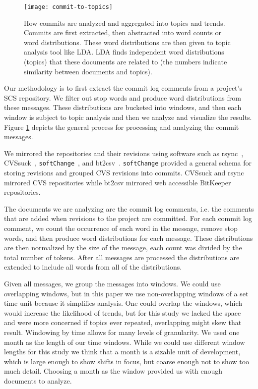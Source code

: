 \documentclass[times, 10pt,twocolumn]{article}
\newcommand{\shrinkit}{\vspace*{-.3em}}
\begin{document}
\shrinkit
{}
\shrinkit


\begin{figure}[t]
  \centering
  \texttt{[image: commit-to-topics]} 
  \caption{How commits are analyzed and aggregated into topics and trends. Commits are first extracted, then abstracted into word counts or word distributions. These word distributions are then given to topic analysis tool like LDA. LDA finds independent word distributions (topics) that these documents are related to (the numbers indicate similarity between documents and topics).}
  \label{fig:commits}
\end{figure}



Our methodology is to first extract the commit log comments from a
project's SCS repository. We filter out stop words and produce word
distributions from these messages. These distributions are bucketed
into windows, and then each window is subject to topic analysis and
then we analyze and visualize the results. Figure \ref{fig:commits}
depicts the general process for processing and analyzing the commit
messages.




\shrinkit
{}
\shrinkit


We mirrored the repositories and their revisions using software such
as rsync~\cite{rsync}, CVSsuck~\cite{cvssuck},
\texttt{softChange}~\cite{dmgseke2004short}, and bt2csv~\cite{methodology}.
\texttt{softChange} provided a general schema for storing revisions
and grouped CVS revisions into commits. CVSsuck and rsync mirrored CVS
repositories while bt2csv mirrored web accessible BitKeeper
repositories.



The documents we are analyzing are the commit log comments, i.e. the
comments that are added when revisions to the project are committed.
For each commit log comment, we count the occurrence of each word in
the message, remove stop words, and then produce word distributions
for each message.  These distributions are then normalized by the size
of the message, each count was divided by the total number of
tokens. After all messages are processed the distributions are
extended to include all words from all of the distributions.

\shrinkit
{}
\shrinkit

Given all messages, we group the messages into windows. We could use
overlapping windows, but in this paper we use non-overlapping windows
of a set time unit because it simplifies analysis.  
One could overlap the
windows, which would increase the likelihood of trends, but for this
study we lacked the space and were more concerned if topics ever
repeated, overlapping might skew that result.
Windowing by time
allows for many levels of granularity.  
We used one month as the
length of our time windows. While we could use different window
lengths for this study we think that a month is a sizable unit of
development, which is large enough to show shifts in focus, but coarse
enough not to show too much detail. Choosing a month as the window
provided us with enough documents to analyze. 
\end{document}
